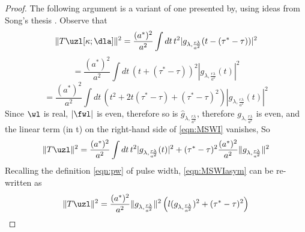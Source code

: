 \begin{proof}
The following argument is a variant of one presented
by\cite{HuangSymes2015SEG}, using ideas from Song's thesis \cite[]{Song:94}. Observe that
\[
\|T\uzl[\kappa;\dla]\|^2 =  \frac{(a^*)^2}{a^2} \int dt\, t^2|g_{\lambda,\frac{r\lambda}{a^2}}(t-(\tau^*-\tau))|^2
\]
\[
=\frac{(a^*)^2}{a^2} \int dt\, (t+(\tau^*-\tau))^2|g_{\lambda,\frac{r\lambda}{a^2}}(t)|^2
\]
\begin{equation}
  \label{eqn:MSWI}
  =\frac{(a^*)^2}{a^2} \int dt\, (t^2 + 2t
  (\tau^*-\tau)+(\tau^*-\tau)^2)|g_{\lambda,\frac{r\lambda}{a^2}}(t)|^2
\end{equation}
Since $\wl$ is real, $|\fwl|$ is even, therefore
so is
$\hat{g}_{\lambda,\frac{r\lambda}{a^2}}$, therefore $g_{\lambda,\frac{r\lambda}{a^2}}$ is even, and the linear term (in t) on the
right-hand side of \ref{eqn:MSWI} vanishes, So
\begin{equation}
  \label{eqn:MSWIasym}
  \|T\uzl\|^2 =
\frac{(a^*)^2}{a^2} \int dt\, t^2|g_{\lambda,\frac{r\lambda}{a^2}}(t)|^2
+(\tau^*-\tau)^2\frac{(a^*)^2}{a^2}\|g_{\lambda,\frac{r\lambda}{a^2}}\|^2
\end{equation}
Recalling the definition \ref{eqn:pw} of pulse width, \ref{eqn:MSWIasym} can be re-written as
\begin{equation}
  \label{eqn:MSWIasym2}
 \|T\uzl\|^2 =
  \frac{(a^*)^2}{a^2}\|g_{\lambda,\frac{r\lambda}{a^2}}\|^2\left(l(g_{\lambda,\frac{r\lambda}{a^2}})^2  + (\tau^*-\tau)^2\right)
\end{equation}



\end{proof}
